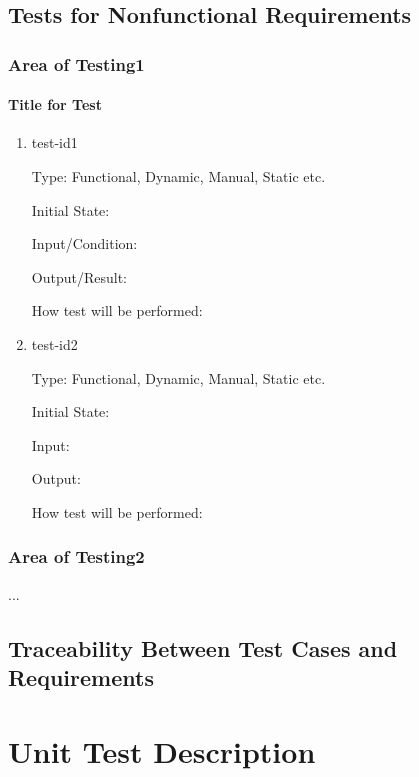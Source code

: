 \documentclass[12pt, titlepage]{article}
\begin{document}
\subsection{Tests for Nonfunctional Requirements}




\subsubsection{Area of Testing1}
		
\paragraph{Title for Test}

\begin{enumerate}

\item{test-id1\\}

Type: Functional, Dynamic, Manual, Static etc.
					
Initial State: 
					
Input/Condition: 
					
Output/Result: 
					
How test will be performed: 
					
\item{test-id2\\}

Type: Functional, Dynamic, Manual, Static etc.
					
Initial State: 
					
Input: 
					
Output: 
					
How test will be performed: 

\end{enumerate}

\subsubsection{Area of Testing2}

...

\subsection{Traceability Between Test Cases and Requirements}


\section{Unit Test Description}
\end{document}
